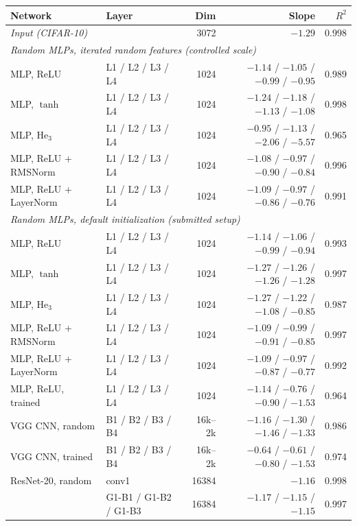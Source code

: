 \begin{tabular}{llrrr}
\toprule
Network & Layer & Dim & Slope & $R^2$ \\
\midrule
\multicolumn{2}{l}{\textit{Input (CIFAR-10)}} & 3072 & $-1.29$ & 0.998 \\
\midrule
\multicolumn{5}{l}{\textit{Random MLPs, iterated random features (controlled scale)}} \\
MLP, ReLU & L1 / L2 / L3 / L4 & 1024 & $-1.14$ / $-1.05$ / $-0.99$ / $-0.95$ & 0.989 \\
MLP, $\tanh$ & L1 / L2 / L3 / L4 & 1024 & $-1.24$ / $-1.18$ / $-1.13$ / $-1.08$ & 0.998 \\
MLP, $\mathrm{He}_3$ & L1 / L2 / L3 / L4 & 1024 & $-0.95$ / $-1.13$ / $-2.06$ / $-5.57$ & 0.965 \\
MLP, ReLU + RMSNorm & L1 / L2 / L3 / L4 & 1024 & $-1.08$ / $-0.97$ / $-0.90$ / $-0.84$ & 0.996 \\
MLP, ReLU + LayerNorm & L1 / L2 / L3 / L4 & 1024 & $-1.09$ / $-0.97$ / $-0.86$ / $-0.76$ & 0.991 \\
\midrule
\multicolumn{5}{l}{\textit{Random MLPs, default initialization (submitted setup)}} \\
MLP, ReLU & L1 / L2 / L3 / L4 & 1024 & $-1.14$ / $-1.06$ / $-0.99$ / $-0.94$ & 0.993 \\
MLP, $\tanh$ & L1 / L2 / L3 / L4 & 1024 & $-1.27$ / $-1.26$ / $-1.26$ / $-1.28$ & 0.997 \\
MLP, $\mathrm{He}_3$ & L1 / L2 / L3 / L4 & 1024 & $-1.27$ / $-1.22$ / $-1.08$ / $-0.85$ & 0.987 \\
MLP, ReLU + RMSNorm & L1 / L2 / L3 / L4 & 1024 & $-1.09$ / $-0.99$ / $-0.91$ / $-0.85$ & 0.997 \\
MLP, ReLU + LayerNorm & L1 / L2 / L3 / L4 & 1024 & $-1.09$ / $-0.97$ / $-0.87$ / $-0.77$ & 0.992 \\
\midrule
MLP, ReLU, trained & L1 / L2 / L3 / L4 & 1024 & $-1.14$ / $-0.76$ / $-0.90$ / $-1.53$ & 0.964 \\
\midrule
VGG CNN, random & B1 / B2 / B3 / B4 & 16k--2k & $-1.16$ / $-1.30$ / $-1.46$ / $-1.33$ & 0.986 \\
VGG CNN, trained & B1 / B2 / B3 / B4 & 16k--2k & $-0.64$ / $-0.61$ / $-0.80$ / $-1.53$ & 0.974 \\
\midrule
ResNet-20, random & conv1 & 16384 & $-1.16$ & 0.998 \\
 & G1-B1 / G1-B2 / G1-B3 & 16384 & $-1.17$ / $-1.15$ / $-1.15$ & 0.997 \\

\end{tabular}
